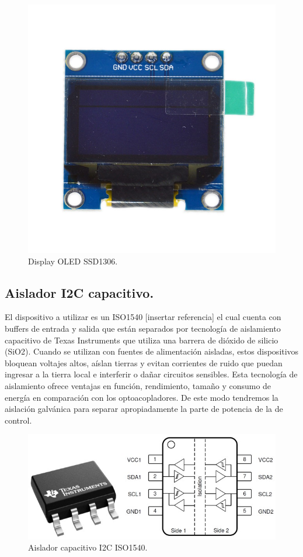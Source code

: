 \begin{figure} [H]
    \centering 
    \includegraphics[scale=0.1]{./imagenes/display.jpg}
    \caption{Display OLED SSD1306.}
    \label{F:display}
\end{figure}

\subsection{Aislador I2C capacitivo.}
El dispositivo a utilizar es un ISO1540 [insertar referencia] el cual cuenta con buffers de entrada y salida que están separados por tecnología de aislamiento capacitivo de Texas Instruments que utiliza una barrera de dióxido de silicio (SiO2). Cuando se utilizan con fuentes de alimentación aisladas, estos dispositivos bloquean voltajes altos, aíslan tierras y evitan corrientes de ruido que puedan ingresar a la tierra local e interferir o dañar circuitos sensibles. Esta tecnología de aislamiento ofrece ventajas en función, rendimiento, tamaño y consumo de energía en comparación con los optoacopladores.
De este modo tendremos la aislación galvánica para separar apropiadamente la parte de potencia de la de control.
\begin{figure}[H]
    \centering
    \includegraphics[scale=0.1]{./imagenes/optoi2c.jpg}
    \caption{Aislador capacitivo I2C ISO1540.}
    \label{F:optoi2c}
\end{figure}

